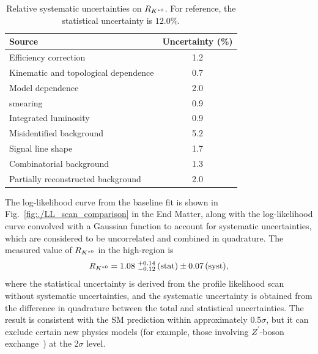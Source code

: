 \begin{table}[tpb]
	\centering
	\caption{Relative systematic uncertainties on $R_{{{K}^{*0}}}$. For reference, the statistical uncertainty is $12.0\%$.}
	\label{tab:effsystematic}
	\begin{tabular}{lc}
\hline
	 Source & Uncertainty (\%) \\
	\hline
	 Efficiency correction &  1.2\\
	 Kinematic and topological dependence & 0.7\\
	 Model dependence & 2.0\\
	 \qsq smearing & 0.9\\
	 Integrated luminosity & 0.9\\
	 \hline
Misidentified background & 5.2 \\
Signal line shape & 1.7 \\
Combinatorial background & 1.3 \\
Partially reconstructed background & 2.0 \\
\hline
	\end{tabular}
\end{table}

 The log-likelihood curve from the baseline fit is shown in Fig.~\ref{fig:./LL_scan_comparison} in the End Matter, along with the log-likelihood curve convolved with a Gaussian function to account for systematic uncertainties, which are considered to be uncorrelated and combined in quadrature.
The measured value of $R_{{{K}^{*0}}}$ in the high-\qsq region is
\begin{equation*}
R_{\Kstarz} = 1.08^{\ +0.14}_{\ -0.12}\stat \pm 0.07\syst,
\end{equation*}
where the statistical uncertainty is derived from the profile likelihood scan without systematic uncertainties, and the systematic uncertainty is obtained from
the difference in quadrature between the total and statistical uncertainties. The result is consistent with the SM prediction within approximately 0.5$\sigma$, but it can exclude certain new physics models (for example, those involving $Z^{\prime}$-boson exchange~\cite{MunirBhutta:2020ber}) at the 2$\sigma$ level.

